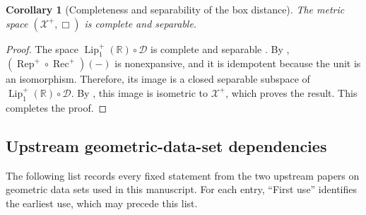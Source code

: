\documentclass{amsart}
\theoremstyle{plain}
\newtheorem{corollary}[theorem]{Corollary}
\theoremstyle{definition}
\theoremstyle{remark}
\newcommand{\R}{\mathbb{R}}
\newcommand{\D}{\mathcal{D}}
\newcommand{\Xp}{\mathcal{X}^{+}}
\newcommand{\Lup}{\operatorname{Lip}^{+}_{1}(\R)}
\begin{document}
\begin{corollary}[Completeness and separability of the box distance]
\label{cor:pullback-box-polish}
The metric space $(\Xp,\Box)$ is complete and separable.
\end{corollary}

\begin{proof}
The space $\Lup\circ\D$ is complete and separable \cite[Theorem~4.10]{gds2}. By , $(\operatorname{Rep}^{+}\circ\operatorname{Rec}^{+})(-)$ is nonexpansive, and it is idempotent because the unit is an isomorphism. Therefore, its image is a closed separable subspace of $\Lup\circ\D$. By , this image is isometric to $\Xp$, which proves the result.
This completes the proof.
\end{proof}
\subsection{Upstream geometric-data-set dependencies}
\label{sec:upstream-dependencies}
The following list records every fixed statement from the two upstream papers on geometric data sets \cite{gds1,gds2} used in this manuscript. For each entry, ``First use'' identifies the earliest use, which may precede this list.
\end{document}
